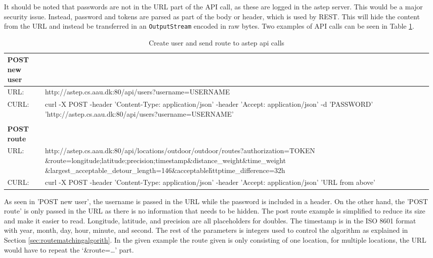 It should be noted that passwords are not in the URL part of the API call, as these are logged in the \gls{astep} server. 
This would be a major security issue.
Instead, password and tokens are parsed as part of the body or header, which is used by REST. 
This will hide the content from the URL and instead be transferred in an \texttt{OutputStream} encoded in raw bytes. 
Two examples of API calls can be seen in Table \ref{tab:apitable}.

\begin{table}[h]
	\scriptsize
	\centering
	\begin{tabularx}{\textwidth}{l X}
		\textbf{POST new user} &  \\\toprule
		URL:          & http://astep.cs.aau.dk:80/api/users?username=USERNAME  \\
		\rowcolor{blue!10}
		CURL:         & curl -X POST -\-header 'Content-Type: application/json' -\-header 'Accept: application/json' -d 'PASSWORD' 'http://astep.cs.aau.dk:80/api/users?username=USERNAME' \\\\
		\textbf{POST route} & \\\toprule
		URL:          & http://astep.cs.aau.dk:80/api/locations/outdoor/outdoor/routes?authorization=TOKEN
						\&route=longitude;latitude;precision;timestamp\&distance\_weight\&time\_weight
						\&largest\_acceptable\_detour\_length=146\&acceptable\'httptime\_difference=32h\\ 
		\rowcolor{blue!10}
		CURL:         & curl -X POST -\-header 'Content-Type: application/json' -\-header 'Accept: application/json' 'URL from above' \\
	\end{tabularx}
	\caption{Create user and send route to \gls{astep} api calls}
	\label{tab:apitable}
\end{table}


As seen in 'POST new user', the username is passed in the URL while the password is included in a header.
On the other hand, the 'POST route' is only passed in the URL as there is no information that needs to be hidden.
The post route example is simplified to reduce its size and make it easier to read.
Longitude, latitude, and precision are all placeholders for doubles.
The timestamp is in the ISO 8601 format with year, month, day, hour, minute, and second.  
The rest of the parameters is integers used to control the algorithm as explained in Section \ref{sec:routematchingalgorith}. 
In the given example the route given is only consisting of one location, for multiple locations, the URL would have to repeat the \enquote*{\&route=\dots} part.

